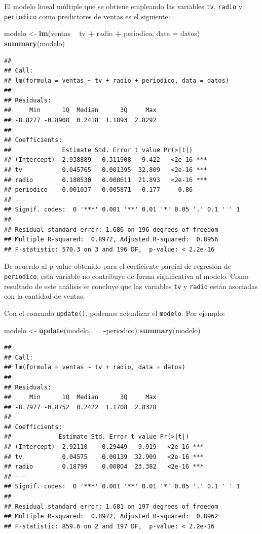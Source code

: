 \documentclass[]{book}
\newenvironment{Shaded}{\begin{snugshade}}{\end{snugshade}}
\newcommand{\KeywordTok}[1]{\textcolor[rgb]{0.13,0.29,0.53}{\textbf{#1}}}
\newcommand{\DataTypeTok}[1]{\textcolor[rgb]{0.13,0.29,0.53}{#1}}
\newcommand{\StringTok}[1]{\textcolor[rgb]{0.31,0.60,0.02}{#1}}
\newcommand{\OperatorTok}[1]{\textcolor[rgb]{0.81,0.36,0.00}{\textbf{#1}}}
\newcommand{\NormalTok}[1]{#1}
\begin{document}
El modelo lineal múltiple que se obtiene empleando las variables
\texttt{tv}, \texttt{radio} y \texttt{periodico} como predictores de
ventas es el siguiente:

\begin{Shaded}
\begin{Highlighting}[]
\NormalTok{modelo <-}\StringTok{ }\KeywordTok{lm}\NormalTok{(ventas }\OperatorTok{~}\StringTok{ }\NormalTok{tv }\OperatorTok{+}\StringTok{ }\NormalTok{radio }\OperatorTok{+}\StringTok{ }\NormalTok{periodico, }\DataTypeTok{data =}\NormalTok{ datos)}
\KeywordTok{summary}\NormalTok{(modelo)}
\end{Highlighting}
\end{Shaded}

\begin{verbatim}
## 
## Call:
## lm(formula = ventas ~ tv + radio + periodico, data = datos)
## 
## Residuals:
##     Min      1Q  Median      3Q     Max 
## -8.8277 -0.8908  0.2418  1.1893  2.8292 
## 
## Coefficients:
##              Estimate Std. Error t value Pr(>|t|)    
## (Intercept)  2.938889   0.311908   9.422   <2e-16 ***
## tv           0.045765   0.001395  32.809   <2e-16 ***
## radio        0.188530   0.008611  21.893   <2e-16 ***
## periodico   -0.001037   0.005871  -0.177     0.86    
## ---
## Signif. codes:  0 '***' 0.001 '**' 0.01 '*' 0.05 '.' 0.1 ' ' 1
## 
## Residual standard error: 1.686 on 196 degrees of freedom
## Multiple R-squared:  0.8972, Adjusted R-squared:  0.8956 
## F-statistic: 570.3 on 3 and 196 DF,  p-value: < 2.2e-16
\end{verbatim}

De acuerdo al p-value obtenido para el coeficiente parcial de regresión
de \texttt{periodico}, esta variable no contribuye de forma
significativa al modelo. Como resultado de este análisis se concluye que
las variables \texttt{tv} y \texttt{radio} están asociadas con la
cantidad de ventas.

Con el comando \texttt{update()}, podemos actualizar el \texttt{modelo}.
Por ejemplo:

\begin{Shaded}
\begin{Highlighting}[]
\NormalTok{modelo <-}\StringTok{ }\KeywordTok{update}\NormalTok{(modelo, .}\OperatorTok{~}\NormalTok{. }\OperatorTok{-}\NormalTok{periodico)}
\KeywordTok{summary}\NormalTok{(modelo)}
\end{Highlighting}
\end{Shaded}

\begin{verbatim}
## 
## Call:
## lm(formula = ventas ~ tv + radio, data = datos)
## 
## Residuals:
##     Min      1Q  Median      3Q     Max 
## -8.7977 -0.8752  0.2422  1.1708  2.8328 
## 
## Coefficients:
##             Estimate Std. Error t value Pr(>|t|)    
## (Intercept)  2.92110    0.29449   9.919   <2e-16 ***
## tv           0.04575    0.00139  32.909   <2e-16 ***
## radio        0.18799    0.00804  23.382   <2e-16 ***
## ---
## Signif. codes:  0 '***' 0.001 '**' 0.01 '*' 0.05 '.' 0.1 ' ' 1
## 
## Residual standard error: 1.681 on 197 degrees of freedom
## Multiple R-squared:  0.8972, Adjusted R-squared:  0.8962 
## F-statistic: 859.6 on 2 and 197 DF,  p-value: < 2.2e-16
\end{verbatim}
\end{document}
